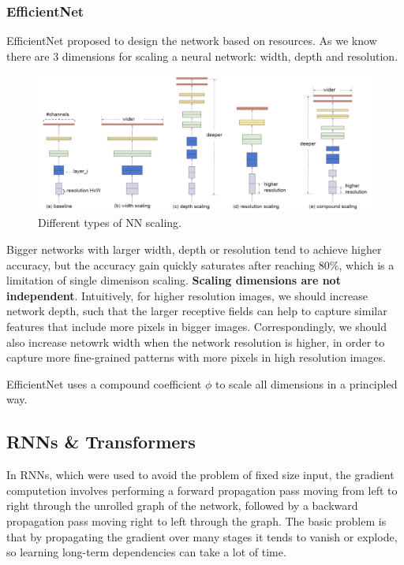 \subsubsection{EfficientNet}
EfficientNet proposed to design the network based on resources.
As we know there are 3 dimensions for scaling a neural network: width, depth and resolution.

\begin{figure}[htbp]
  \centering
  \includegraphics[width=0.8\linewidth]{./img/efficientnet.jpg}
  \caption{Different types of NN scaling.}
\end{figure}

Bigger networks with larger width, depth or resolution tend to achieve higher accuracy, but the accuracy gain quickly saturates after reaching $80 \%$, which is a limitation of single dimenison scaling.
\textbf{Scaling dimensions are not independent}. Intuitively, for higher resolution images, we should increase network depth, such that the larger receptive fields can help to capture similar features that include more pixels in bigger images.
Correspondingly, we should also increase netowrk width when the network resolution is higher, in order to capture more fine-grained patterns with more pixels in high resolution images.

EfficientNet  uses a compound coefficient $\phi$ to scale all dimensions in a principled way.

\subsection{RNNs \& Transformers}

In RNNs, which were used to avoid the problem of fixed size input, the gradient computetion involves performing a forward propagation pass moving from left to right through the unrolled graph of the network, followed by a backward propagation pass moving right to left through the graph.
The basic problem is that by propagating the gradient over many stages it tends to vanish or explode, so learning long-term dependencies can take a lot of time.

